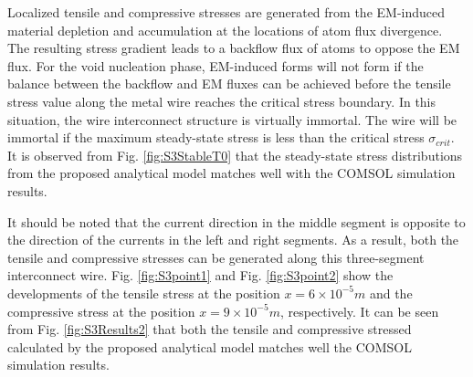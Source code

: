 Localized tensile and compressive stresses are generated from the EM-induced material depletion and accumulation at the locations of atom flux divergence. The resulting stress gradient leads to a backflow flux of atoms to oppose the EM flux. For the void nucleation phase, EM-induced forms will not form if the balance between the backflow and EM fluxes can be achieved before the tensile stress value along the metal wire reaches the critical stress boundary. In this situation, the wire interconnect structure is virtually immortal. The wire will be immortal if the maximum steady-state stress is less than the critical stress $\sigma_{crit}$. It is observed from Fig. \ref{fig:S3StableT0} that the steady-state stress distributions from the proposed analytical model matches well with the COMSOL simulation results.

It should be noted that the current direction in the middle segment is opposite to the direction of the currents in the left and right segments. As a result, both the tensile and compressive stresses can be generated along this three-segment interconnect wire. Fig. \ref{fig:S3point1} and Fig. \ref{fig:S3point2} show the developments of the tensile stress at the position $x=6\times 10^{-5}m$ and the compressive stress at the position $x=9\times 10^{-5}m$, respectively. It can be seen from Fig. \ref{fig:S3Results2} that both the tensile and compressive stressed calculated by the proposed analytical model matches well the COMSOL simulation results. 


